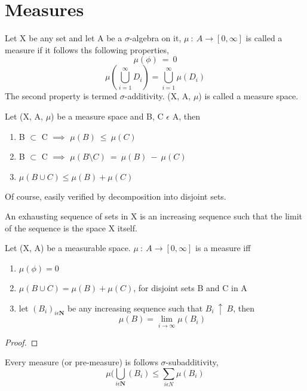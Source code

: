 \section{Measures}
\begin{definition}
    Let X be any set and let A be a $\sigma$-algebra on it, $\mu \: : \:
    A \rightarrow [0,\infty]$ is called a measure if it follows ths following
    properties,
    \[
        \mu(\phi) \: = \: 0
    \]
    \[
        \mu(\bigcup_{i=1}^{\infty} D_{i}) = \bigcup_{i=1}^{\infty}
        \mu(D_{i})
    \]
    The second property is termed $\sigma$-additivity.
    (X, A, $\mu$) is called a measure space.
\end{definition}

\begin{lemma}
    Let (X, A, $\mu$) be a measure space and B, C $\epsilon$ A, then
    \begin{enumerate}
        \item B $\subset$ C $\implies$ $\mu(B) \: \leqslant \: \mu(C)$
        \item B $\subset$ C $\implies$ $\mu(B \setminus C) \: = \: \mu(B) \: - \:
            \mu(C)$
        \item $\mu(B \cup C) \leqslant \mu(B) + \mu(C)$
    \end{enumerate}
\end{lemma}
Of course, easily verified by decomposition into disjoint sets.
\begin{definition}
    An exhausting sequence of sets in X is an increasing sequence such that the
    limit of the sequence is the space X itself.
\end{definition}
\begin{theorem}
    Let (X, A) be a measurable space. $\mu \: : \: A \rightarrow [0,\infty]$ is
    a measure iff
    \begin{enumerate}
        \item $\mu(\phi) = 0$
        \item $\mu(B \cup C) = \mu(B) + \mu(C)$, for disjoint sets B and C in A
        \item let $(B_i)_{i \epsilon \bm{N}}$ be any increasing sequence such
            that $B_i \: \uparrow \: B$, then
            \[
                \mu(B) = \lim_{i \rightarrow \infty} \mu(B_i)
            \]
    \end{enumerate}
\end{theorem}
\begin{proof}
\end{proof}
\begin{theorem}
    Every measure (or pre-measure) is follows $\sigma$-subadditivity,
    \[
        \mu(\bigcup_{i \epsilon \bm{N}}(B_i) \leqslant \sum_{i \epsilon N}\mu(B_i)
    \]
\end{theorem}

